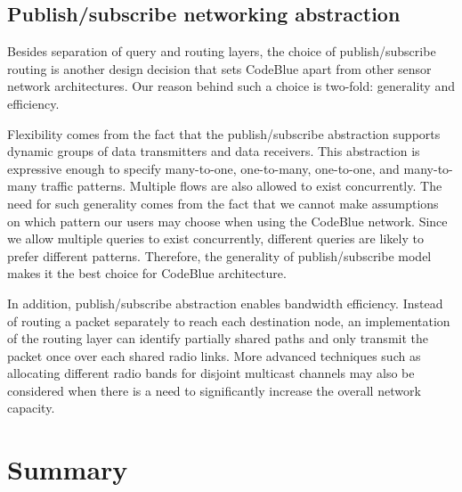 \subsection {Publish/subscribe networking abstraction}

Besides separation of query and routing layers, the choice of
publish/subscribe routing is another design decision that sets CodeBlue apart from
other sensor network architectures. Our reason behind such a choice is two-fold:
generality and efficiency. 

Flexibility comes from the fact that the
publish/subscribe abstraction supports dynamic groups of data transmitters and
data receivers. This abstraction is expressive enough to specify many-to-one,
one-to-many, one-to-one, and many-to-many traffic patterns. Multiple flows are also
allowed to exist concurrently. The need for such generality comes from the
fact that
we cannot make assumptions on which pattern our users may choose when using the
CodeBlue network. Since we allow multiple queries to exist concurrently,
different queries are likely to prefer different patterns. Therefore, 
the generality of publish/subscribe model makes it the best choice for
CodeBlue architecture.

In addition, publish/subscribe abstraction enables bandwidth efficiency.
Instead of routing a packet separately to reach each destination node, an
implementation of the routing layer can identify partially shared paths and
only transmit the packet once over each shared radio links. More advanced
techniques such as allocating different radio bands for disjoint multicast
channels may also be considered when there is a need to significantly increase
the overall network capacity.



\section{Summary}

